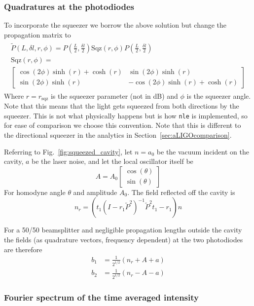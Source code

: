 \documentclass[aps,pra,superscriptaddress,reprint,nofootinbib]{revtex4-1}
\newcommand{\code}[1]{\texttt{#1}}
\begin{document}
\subsubsection{Quadratures at the photodiodes}

To incorporate the squeezer we borrow the above solution but change the propagation matrix to
\begin{align*}
	\begin{gathered}
	\tilde{P}(L, \delta l, r, \phi) = P\left(\frac{L}{2}, \frac{\delta l}{2}\right) \mathrm{Sqz}(r, \phi) P\left(\frac{L}{2}, \frac{\delta l}{2}\right) \\
	\mathrm{Sqz}(r, \phi) =\\
	\begin{bmatrix}
	\cos(2 \phi) \sinh(r) + \cosh(r) & \sin(2\phi) \sinh(r)\\ 
	\sin(2\phi) \sinh(r) & -\cos(2 \phi) \sinh(r) + \cosh(r)
	\end{bmatrix}
	\end{gathered}
\end{align*}
Where $r = r_\mathrm{sqz}$ is the squeezer parameter (not in dB) and $\phi$ is the squeezer angle. Note that this means that the light gets squeezed from both directions by the squeezer. This is not what physically happens but is how \code{nle} is implemented, so for ease of comparison we choose this convention. Note that this is different to the directional squeezer in the analytics in Section~\ref{sec:aLIGOcomparison}.


Referring to Fig.~\ref{fig:squeezed_cavity}, let $n = a_0$ be the vacuum incident on the cavity, $a$ be the laser noise, and let the local oscillator itself be
$$A = A_0 \begin{bmatrix}
\cos(\theta)\\ 
\sin(\theta)
\end{bmatrix}$$
For homodyne angle $\theta$ and amplitude $A_0$. The field reflected off the cavity is
$$n_r = \left(t_1 (I - r_1 \tilde{P}^2)^{-1} \tilde{P}^2 t_1 - r_1 \right) n$$


For a 50/50 beamsplitter and negligible propagation lengths outside the cavity the fields (as quadrature vectors, frequency dependent) at the two photodiodes are therefore
\begin{align*}
b_1 &= \frac{1}{2^{1/2}} \left( n_r + A + a\right) \\
b_2 &= \frac{1}{2^{1/2}} \left( n_r - A - a\right)
\end{align*}

\subsubsection{Fourier spectrum of the time averaged intensity}
\end{document}
